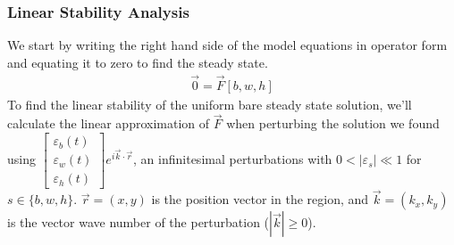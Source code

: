\documentclass{article}
\numberwithin{equation}{section}
\begin{document}
\subsubsection{Linear Stability Analysis}
We start by writing the right hand side of the model equations in operator form and equating it to zero to find the steady state.
\begin{align}\label{eqn:functional_eq}
    \vec{0}=\vec{F}[b,w,h]
\end{align}
To find the linear stability of the uniform bare steady state solution, we'll calculate the linear approximation of $\vec{F}$  when perturbing the solution we found using $\begin{bmatrix}
        \varepsilon_b(t) \\ \varepsilon_w(t) \\ \varepsilon_h(t)
    \end{bmatrix}e^{i\vec{k}\cdot\vec{r}}$, an infinitesimal perturbations with $0<|\varepsilon_s|\ll1$ for $s\in \{b,w,h\}$.  $\vec{r}=(x,y)$ is the position vector in the region, and $\vec{k}=(k_x,k_y)$ is the vector wave number of the perturbation ($|\vec{k}|\geq 0$).
\end{document}
